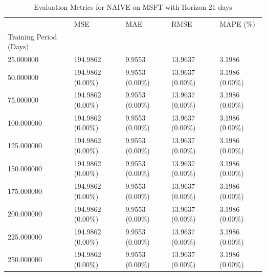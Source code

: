 \begin{table}
\caption{Evaluation Metrics for NAIVE on MSFT with Horizon 21 days}
\label{tab:naive_MSFT_h21_metrics}
\begin{tabular}{lllll}
\toprule
 & MSE & MAE & RMSE & MAPE (\%) \\
Training Period (Days) &  &  &  &  \\
\midrule
25.000000 & 194.9862 & 9.9553 & 13.9637 & 3.1986 \\
50.000000 & 194.9862 (0.00\%) & 9.9553 (0.00\%) & 13.9637 (0.00\%) & 3.1986 (0.00\%) \\
75.000000 & 194.9862 (0.00\%) & 9.9553 (0.00\%) & 13.9637 (0.00\%) & 3.1986 (0.00\%) \\
100.000000 & 194.9862 (0.00\%) & 9.9553 (0.00\%) & 13.9637 (0.00\%) & 3.1986 (0.00\%) \\
125.000000 & 194.9862 (0.00\%) & 9.9553 (0.00\%) & 13.9637 (0.00\%) & 3.1986 (0.00\%) \\
150.000000 & 194.9862 (0.00\%) & 9.9553 (0.00\%) & 13.9637 (0.00\%) & 3.1986 (0.00\%) \\
175.000000 & 194.9862 (0.00\%) & 9.9553 (0.00\%) & 13.9637 (0.00\%) & 3.1986 (0.00\%) \\
200.000000 & 194.9862 (0.00\%) & 9.9553 (0.00\%) & 13.9637 (0.00\%) & 3.1986 (0.00\%) \\
225.000000 & 194.9862 (0.00\%) & 9.9553 (0.00\%) & 13.9637 (0.00\%) & 3.1986 (0.00\%) \\
250.000000 & 194.9862 (0.00\%) & 9.9553 (0.00\%) & 13.9637 (0.00\%) & 3.1986 (0.00\%) \\
\bottomrule
\end{tabular}
\end{table}
